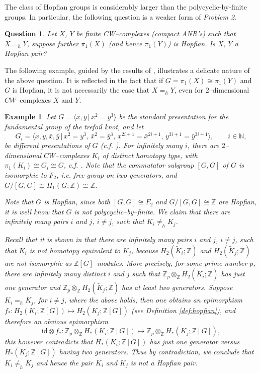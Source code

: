\documentclass[reqno,12pt]{amsart}
\newtheorem{question}[theorem]{Question}
\theoremstyle{ourremark}
\newtheorem{example}[theorem]{Example}
\numberwithin{equation}{section}
\numberwithin{theorem}{section}
\begin{document}
The class of Hopfian groups is considerably larger than the polycyclic-by-finite groups. In particular, the following question is a weaker form of {\em Problem 2}.
\begin{question}\label{q:hopfian-pair}
Let $X$, $Y$ be finite CW--complexes (compact ANR's) such that  $X=_h Y$, suppose further $\pi_1(X)$ (and hence $\pi_1(Y)$) is Hopfian. Is $X$, $Y$ a Hopfian pair? 
\end{question}
{\noindent} The following example, guided by the results of \cite{Berridge-Dunwoody79, Harlander-Jensen06}, illustrates a delicate nature of the above question. It is reflected in the fact that if $G=\pi_1(X)\cong \pi_1(Y)$ and $G$ is Hopfian, it is not necessarily the case that $X=_h Y$, even for $2$--dimensional $CW$--complexes $X$ and $Y$.
\begin{example}
  Let $G=\langle x,y\,|\,x^2=y^3\rangle$ be the standard presentation for the fundamental group of the trefoil knot, and 
  let
 \[
  G_i=\langle x,y,\bar{x},\bar{y}\,|\,x^2=y^3,\, \bar{x}^2=\bar{y}^3,\, x^{2i+1}=\bar{x}^{2i+1},\, y^{3i+1}=\bar{y}^{3i+1}\rangle,\qquad i\in \mathbb{N},
  \]
be different presentations of $G$ (c.f. \cite{Berridge-Dunwoody79, Harlander-Jensen06}). For infinitely many $i$, there are $2$--dimensional $CW$--complexes $K_i$ of distinct homotopy type, with $\pi_1(K_i)\cong G_i\cong G$, c.f. \cite{Harlander-Jensen06}. Note that the commutator subgroup $[G,G]$ of $G$ is isomorphic to $F_2$, i.e. free group on two generators, and $G\bigl/[G,G]\cong H_1(G;{\mathbb{Z}})\cong {\mathbb{Z}}$.

 Note that $G$ is Hopfian, since both $[G,G]\cong F_2$ and $G\bigl/ [G,G]\cong {\mathbb{Z}}$ are Hopfian, it is well know that $G$ is  {\em not} polycyclic--by--finite. We claim that there are infinitely many pairs $i$ and $j$, $i\neq j$, such that $K_i\neq_h K_j$. 

 Recall  that it is shown in \cite{Berridge-Dunwoody79, Harlander-Jensen06} that there are infinitely many pairs $i$ and $j$, $i\neq j$, such that $K_i$ is not homotopy equivalent to $K_j$, because $H_2(\widetilde{K}_i;{\mathbb{Z}})$ and $H_2(\widetilde{K}_j;{\mathbb{Z}})$ are not isomorphic as ${\mathbb{Z}}[G]$--modules. More precisely, for some prime number $p$, there are infinitely many distinct $i$ and $j$ such that ${\mathbb{Z}}_p\otimes_{\mathbb{Z}} H_2(\widetilde{K}_i;{\mathbb{Z}})$ has just one generator and  ${\mathbb{Z}}_p\otimes_{\mathbb{Z}} H_2(\widetilde{K}_j;{\mathbb{Z}})$ has at least two generators. 
Suppose $K_i=_h K_j$, for $i\neq j$, where the above holds, then one obtains an epimorphism  $f_\ast:H_2(K_i;{\mathbb{Z}}[G])\longmapsto H_2(K_j;{\mathbb{Z}}[G])$ (see Definition \ref{def:hopfian}), and therefore an obvious epimorphism
\[
 \text{id}\otimes f_\ast:{\mathbb{Z}}_p\otimes_{\mathbb{Z}} H_\ast(K_i;{\mathbb{Z}}[G])\longmapsto {\mathbb{Z}}_p\otimes_{\mathbb{Z}} H_\ast(K_j;{\mathbb{Z}}[G]),
\]
this however contradicts that  $H_\ast(K_i;{\mathbb{Z}}[G])$ has just one generator versus $H_\ast(K_j;{\mathbb{Z}}[G])$ having two generators. Thus by contradiction, we conclude that $K_i\neq_h K_j$ and hence the pair $K_i$ and $K_j$ is not a Hopfian pair. 


\end{example}
\end{document}
